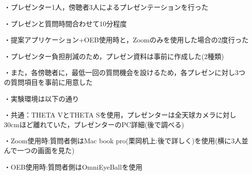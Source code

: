 ・プレゼンター1人，傍聴者3人によるプレゼンテーションを行った

・プレゼンと質問時間合わせて10分程度

・提案アプリケーション+OEB使用時と，Zoomのみを使用した場合の2度行った

・プレゼンター負担削減のため，プレゼン資料は事前に作成した(2種類)

・また，各傍聴者に，最低一回の質問機会を設けるため，各プレゼンに対し3つの質問項目を事前に用意した

・実験環境は以下の通り

・共通：THETA VとTHETA Sを使用，プレゼンターは全天球カメラに対し30cmほど離れていた，プレゼンターのPC詳細(後で調べる)

・Zoom使用時:質問者側はMac book pro(栗岡机上:後で詳しく)を使用(横に3人並んで一つの画面を見た)

・OEB使用時:質問者側はOmniEyeBallを使用